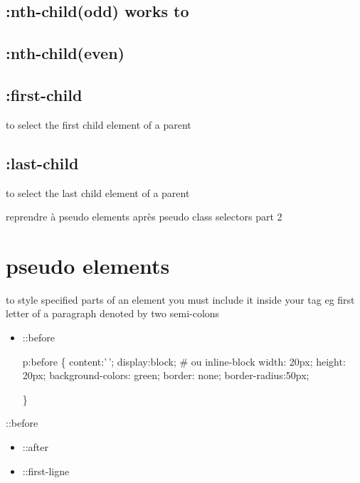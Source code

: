 \documentclass[
]{book}
\begin{document}
\hypertarget{nth-childodd-works-to}{%
\subsection{:nth-child(odd) works to}\label{nth-childodd-works-to}}

\hypertarget{nth-childeven}{%
\subsection{:nth-child(even)}\label{nth-childeven}}

\hypertarget{first-child}{%
\subsection{:first-child}\label{first-child}}

to select the first child element of a parent

\hypertarget{last-child}{%
\subsection{:last-child}\label{last-child}}

to select the last child element of a parent

reprendre à pseudo elements après pseudo class selectors part 2

\hypertarget{pseudo-elements}{%
\section{pseudo elements}\label{pseudo-elements}}

to style specified parts of an element
you must include it inside your tag
eg first letter of a paragraph
denoted by two semi-colons

\begin{itemize}
\item
  ::before

  p:before \{
  content:'\,';
  display:block; \# ou inline-block
  width: 20px;
  height: 20px;
  background-colors: green;
  border: none;
  border-radius:50px;

  \}
\end{itemize}

::before

\begin{itemize}
\item
  ::after
\item
  ::first-ligne
\end{itemize}
\end{document}
